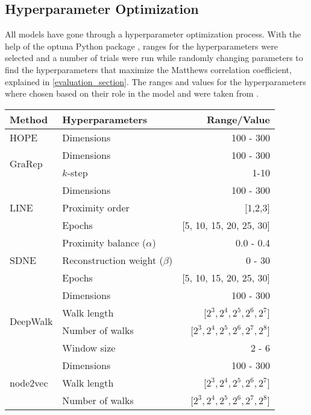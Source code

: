 \subsection{Hyperparameter Optimization}
All models have gone through a hyperparameter optimization process. With the help of the optuna Python package \cite{akiba_optuna:_2019}, ranges for the hyperparameters were selected and a number of trials were run while randomly changing parameters to find the hyperparameters that maximize the Matthews correlation coefficient, explained in \ref{evaluation_section}. The ranges and values for the hyperparameters where chosen based on their role in the model and were taken from \cite{yue_graph_2019}.

\begin{table}[ht!]
    \centering
    \begin{tabular}{ |l|l|r| } 
        \hline
        \textbf{Method} & \textbf{Hyperparameters} & \textbf{Range/Value} \\
        \hline
        HOPE & Dimensions & 100 - 300 \\
        \hline
        \multirow{2}{5em}{GraRep} & Dimensions & 100 - 300 \\ 
            & $k$-step & 1-10 \\ 
        \hline
        \multirow{3}{4em}{LINE} & Dimensions & 100 - 300 \\ 
            & Proximity order & [1,2,3] \\
            & Epochs & [5, 10, 15, 20, 25, 30] \\
        \hline
        \multirow{3}{5em}{SDNE} & Proximity balance ($\alpha$) & 0.0 - 0.4 \\ 
            & Reconstruction weight ($\beta$) & 0 - 30 \\
            & Epochs & [5, 10, 15, 20, 25, 30] \\
        \hline
        \multirow{4}{5em}{DeepWalk} & Dimensions & 100 - 300 \\ 
            & Walk length & [$2^3, 2^4, 2^5, 2^6, 2^7$] \\
            & Number of walks & [$2^3, 2^4, 2^5, 2^6, 2^7, 2^8$] \\
            & Window size & 2 - 6 \\
        \hline
        \multirow{6}{5em}{node2vec} & Dimensions & 100 - 300 \\ 
            & Walk length & [$2^3, 2^4, 2^5, 2^6, 2^7$] \\
            & Number of walks & [$2^3, 2^4, 2^5, 2^6, 2^7, 2^8$] \\

\end{tabular}
\end{table}
